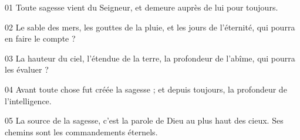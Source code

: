 01 Toute sagesse vient du Seigneur, et demeure auprès de lui pour toujours.

02 Le sable des mers, les gouttes de la pluie, et les jours de l’éternité, qui pourra en faire le compte ?

03 La hauteur du ciel, l’étendue de la terre, la profondeur de l’abîme, qui pourra les évaluer ?

04 Avant toute chose fut créée la sagesse ; et depuis toujours, la profondeur de l’intelligence.

05 La source de la sagesse, c’est la parole de Dieu au plus haut des cieux. Ses chemins sont les commandements éternels.
